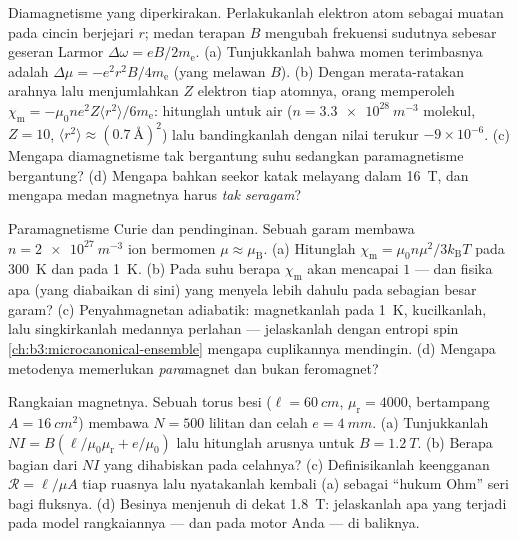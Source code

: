 \begin{exercise}[$\star\star$]\label{exo:b3:electromagnetism-in-matter:8}
Diamagnetisme yang diperkirakan. Perlakukanlah elektron atom sebagai muatan pada
cincin berjejari $r$; medan terapan $B$ mengubah frekuensi sudutnya sebesar
geseran Larmor $\Delta\omega = eB/2m_{\text{e}}$. (a) Tunjukkanlah bahwa
momen terimbasnya adalah $\Delta\mu = -e^2r^2B/4m_{\text{e}}$ (yang melawan
$B$). (b) Dengan merata-ratakan arahnya lalu menjumlahkan $Z$ elektron tiap
atomnya, orang memperoleh $\chi_{\text{m}} = -\mu_0ne^2Z\langle
r^2\rangle/6m_{\text{e}}$: hitunglah untuk air ($n =
\qty{3.3e28}{m^{-3}}$ molekul, $Z = 10$, $\langle r^2\rangle
\approx (\qty{0.7}{\angstrom})^2$) lalu bandingkanlah dengan nilai terukur
$-9\times10^{-6}$. (c) Mengapa diamagnetisme tak bergantung suhu
sedangkan paramagnetisme bergantung? (d) Mengapa bahkan seekor katak melayang dalam
\qty{16}{T}, dan mengapa medan magnetnya harus \emph{tak seragam}?
\end{exercise}

\begin{exercise}[$\star\star$]\label{exo:b3:electromagnetism-in-matter:9}
Paramagnetisme Curie dan pendinginan. Sebuah garam membawa $n =
\qty{2e27}{m^{-3}}$ ion bermomen $\mu \approx \mu_{\text{B}}$.
(a) Hitunglah $\chi_{\text{m}} = \mu_0n\mu^2/3k_{\text{B}}T$ pada
\qty{300}{K} dan pada \qty{1}{K}. (b) Pada suhu berapa
$\chi_{\text{m}}$ akan mencapai $1$ --- dan fisika apa (yang diabaikan di
sini) yang menyela lebih dahulu pada sebagian besar garam? (c) Penyahmagnetan
adiabatik: magnetkanlah pada \qty{1}{K}, kucilkanlah, lalu singkirkanlah medannya perlahan ---
jelaskanlah dengan entropi spin
\cref{ch:b3:microcanonical-ensemble} mengapa cuplikannya mendingin. (d) Mengapa
metodenya memerlukan \emph{para}magnet dan bukan feromagnet?
\end{exercise}

\begin{exercise}[$\star\star\star$]\label{exo:b3:electromagnetism-in-matter:10}
Rangkaian magnetnya. Sebuah torus besi ($\ell = \qty{60}{cm}$,
$\mu_{\text{r}} = 4000$, bertampang $A = \qty{16}{cm^2}$) membawa
$N = 500$ lilitan dan celah $e = \qty{4}{mm}$. (a) Tunjukkanlah $NI =
B(\ell/\mu_0\mu_{\text{r}} + e/\mu_0)$ lalu hitunglah arusnya untuk
$B = \qty{1.2}{T}$. (b) Berapa bagian dari $NI$ yang dihabiskan pada celahnya?
(c) Definisikanlah keengganan $\mathcal R = \ell/\mu A$ tiap
ruasnya lalu nyatakanlah kembali (a) sebagai ``hukum Ohm'' seri bagi fluksnya. (d)
Besinya menjenuh di dekat \qty{1.8}{T}: jelaskanlah apa yang terjadi pada
model rangkaiannya --- dan pada motor Anda --- di baliknya.
\end{exercise}

